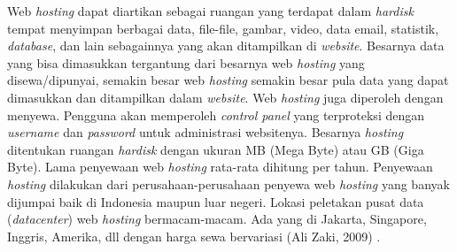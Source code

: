 Web \textit{hosting} dapat diartikan sebagai ruangan yang terdapat dalam \textit{hardisk} tempat menyimpan berbagai data, file-file, gambar, video, data email, statistik, \textit{database}, dan lain sebagainnya yang akan ditampilkan di \textit{website}. Besarnya data yang bisa dimasukkan tergantung dari besarnya web \textit{hosting} yang disewa/dipunyai, semakin besar web \textit{hosting} semakin besar pula data yang dapat dimasukkan dan ditampilkan dalam \textit{website}. Web \textit{hosting} juga diperoleh dengan menyewa. Pengguna akan memperoleh \textit{control panel} yang terproteksi dengan \textit{username} dan \textit{password} untuk administrasi websitenya. Besarnya \textit{hosting} ditentukan ruangan \textit{hardisk} dengan ukuran MB (Mega Byte) atau GB (Giga Byte). Lama penyewaan web \textit{hosting} rata-rata dihitung per tahun. Penyewaan \textit{hosting} dilakukan dari perusahaan-perusahaan penyewa web \textit{hosting} yang banyak dijumpai baik di Indonesia maupun luar negeri. Lokasi peletakan pusat data (\textit{datacenter}) web \textit{hosting} bermacam-macam. Ada yang di Jakarta, Singapore, Inggris, Amerika, dll dengan harga sewa bervariasi (Ali Zaki, 2009) \cite{7}. 
